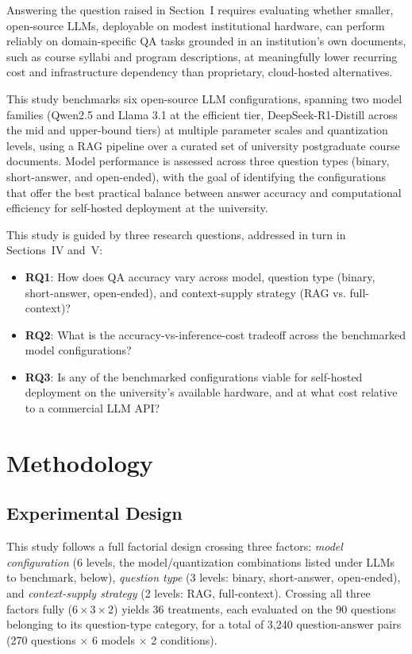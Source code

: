 \documentclass[conference]{IEEEtran}
\begin{document}
Answering the question raised in Section~I requires evaluating whether smaller, open-source \glspl{LLM}, deployable on modest institutional hardware, can perform reliably on domain-specific \gls{QA} tasks grounded in an institution's own documents, such as course syllabi and program descriptions, at meaningfully lower recurring cost and infrastructure dependency than proprietary, cloud-hosted alternatives.

This study benchmarks six open-source \gls{LLM} configurations, spanning two model families (Qwen2.5 and Llama 3.1 at the efficient tier, DeepSeek-R1-Distill across the mid and upper-bound tiers) at multiple parameter scales and quantization levels, using a \gls{RAG} pipeline over a curated set of university postgraduate course documents.
Model performance is assessed across three question types (binary, short-answer, and open-ended), with the goal of identifying the configurations that offer the best practical balance between answer accuracy and computational efficiency for self-hosted deployment at the university.

This study is guided by three research questions, addressed in turn in Sections~IV and~V:
\begin{itemize}
  \item \textbf{RQ1}: How does \gls{QA} accuracy vary across model, question type (binary, short-answer, open-ended), and context-supply strategy (RAG vs. full-context)?
  \item \textbf{RQ2}: What is the accuracy-vs-inference-cost tradeoff across the benchmarked model configurations?
  \item \textbf{RQ3}: Is any of the benchmarked configurations viable for self-hosted deployment on the university's available hardware, and at what cost relative to a commercial \gls{LLM} API?
\end{itemize}

\section{Methodology}

\subsection{Experimental Design}

This study follows a full factorial design crossing three factors: \textit{model configuration} (6 levels, the model/quantization combinations listed under LLMs to benchmark, below), \textit{question type} (3 levels: binary, short-answer, open-ended), and \textit{context-supply strategy} (2 levels: RAG, full-context).
Crossing all three factors fully ($6 \times 3 \times 2$) yields 36 treatments, each evaluated on the 90 questions belonging to its question-type category, for a total of 3{,}240 question-answer pairs (270 questions $\times$ 6 models $\times$ 2 conditions).
\end{document}

